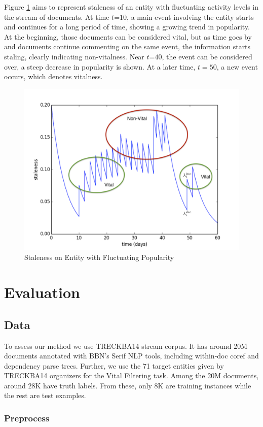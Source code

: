 \documentclass{article}
\begin{document}
Figure \ref{stalenessmedium} aims to represent staleness of an entity with fluctuating activity levels in the stream of documents. At time $t\mathord{=}10$, a main event involving the entity starts and continues for a long period of time, showing a growing trend in popularity. 
At the beginning, those documents can be considered vital, but as time goes by and documents continue commenting on the same event, the information starts staling, clearly indicating non-vitalness.
Near $t\mathord{=}40$, the event can be considered over, a steep decrease in popularity is shown. At a later time, $t=50$, a new event occurs, which denotes vitalness.

\begin{figure}[h!]
\centering
\includegraphics[width=.5\textwidth]{staleness2.pdf}
\caption{Staleness on Entity with Fluctuating Popularity}
\label{stalenessmedium}
\end{figure}


\section{Evaluation}
\label{evaluation}

\subsection{Data}
\label{data}

To assess our method we use TRECKBA14 stream corpus. It has around 20M documents annotated with BBN's Serif NLP tools, including within-doc coref and dependency parse trees. Further, we use the 71 target entities given by TRECKBA14 organizers for the Vital Filtering task. Among the 20M documents, around 28K have truth labels. From these, only 8K are training instances while the rest are test examples.

\subsubsection{Preprocess}
\end{document}
